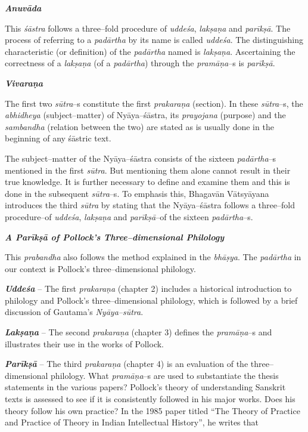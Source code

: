 \textit{\textbf{Anuvāda}}

This \textit{śāstra} follows a three–fold procedure of \textit{uddeśa}, \textit{lakṣaṇa} and \textit{parīkṣā}. The process of referring to a \textit{padārtha} by its name is called \textit{uddeśa}. The distinguishing characteristic (or definition) of the \textit{padārtha} named is\textit{ lakṣaṇa}. Ascertaining the correctness of a \textit{lakṣaṇa} (of a \textit{padārtha}) through the \textit{pramāṇa}–s is \textit{parīkṣā}.

\textit{\textbf{Vivaraṇa}}

The first two \textit{sūtra}–s constitute the first \textit{prakaraṇa} (section). In these \textit{sūtra}–s, the \textit{abhidheya} (subject–matter) of Nyāya–śāstra, its \textit{prayojana} (purpose) and the \textit{sambandha} (relation between the two) are stated as is usually done in the beginning of any śāstric text.

The subject–matter of the Nyāya–śāstra consists of the sixteen \textit{padārtha}–s mentioned in the first \textit{sūtra}. But mentioning them alone cannot result in their true knowledge. It is further necessary to define and examine them and this is done in the subsequent \textit{sūtra}–s. To emphasis this, Bhagavān Vātsyāyana introduces the third \textit{sūtra} by stating that the Nyāya–śāstra follows a three–fold procedure–of \textit{uddeśa}, \textit{lakṣaṇa} and \textit{parīkṣā}–of the sixteen \textit{padārtha}–s.

\textbf{\textit{A Parīkṣā of Pollock’s Three–dimensional Philology}}

This \textit{prabandha} also follows the method explained in the \textit{bhāṣya}. The \textit{padārtha} in our context is Pollock’s three–dimensional philology.

\textit{\textbf{Uddeśa }} – The first \textit{prakaraṇa} (chapter 2) includes a historical introduction to philology and Pollock’s three–dimensional philology, which is followed by a brief discussion of Gautama’s \textit{Nyāya–sūtra}.

\newpage

\textit{\textbf{Lakṣaṇa }} – The second \textit{prakaraṇa} (chapter 3) defines the \textit{pramāṇa}–s and illustrates their use in the works of Pollock.

\textit{\textbf{Parīkṣā }} – The third \textit{prakaraṇa} (chapter 4) is an evaluation of the three–dimensional philology. What \textit{pramāṇa}–s are used to substantiate the thesis statements in the various papers? Pollock’s theory of understanding Sanskrit texts is assessed to see if it is consistently followed in his major works. Does his theory follow his own practice? In the 1985 paper titled “The Theory of Practice and Practice of Theory in Indian Intellectual History”, he writes that

